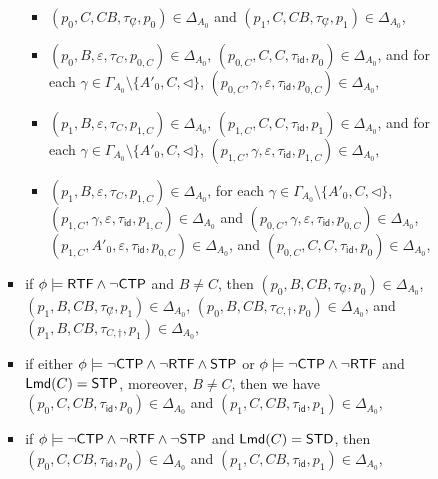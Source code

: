 \documentclass[preprint,12pt]{elsarticle}
\newcommand\lmd{{\sf Lmd}}
\newcommand\standard{{\sf STD}}
\newcommand\singletop{{\sf STP}}
\newcommand\ctpflag{{\sf CTP}}
\newcommand\stpflag{{\sf STP}}
\newcommand\rtfflag{{\sf RTF}}
\newcommand{\id}{\mathsf{id}}
\begin{document}
\begin{itemize}
\begin{itemize}
\begin{itemize}
\begin{itemize}
				\begin{itemize}
					\item $(p_0, C, CB, \tau_{\not C}, p_0) \in \Delta_{A_0}$ and $(p_1, C, CB, \tau_{\not C}, p_1) \in \Delta_{A_0}$, 
%
					\item $(p_0, B, \varepsilon, \tau_{C}, p_{0,C}) \in \Delta_{A_0}$, $(p_{0,C}, C, C, \tau_{\id}, p_0)  \in \Delta_{A_0}$, and for each $\gamma \in \Gamma_{A_0} \setminus \{A'_0, C, \triangleleft\}$, $(p_{0,C}, \gamma, \varepsilon, \tau_{\id}, p_{0,C}) \in \Delta_{A_0}$, 
%					
					\item $(p_1, B, \varepsilon, \tau_{C}, p_{1, C}) \in \Delta_{A_0}$, $(p_{1, C}, C, C, \tau_{\id}, p_1)  \in \Delta_{A_0}$, and for each $\gamma \in \Gamma_{A_0} \setminus \{A'_0, C, \triangleleft\}$, $(p_{1,C}, \gamma, \varepsilon, \tau_{\id}, p_{1,C}) \in \Delta_{A_0}$, 
%
					\item $(p_1, B, \varepsilon, \tau_{C}, p_{1, C}) \in \Delta_{A_0}$, for each $\gamma \in \Gamma_{A_0} \setminus \{A'_0, C, \triangleleft\}$, $(p_{1,C}, \gamma, \varepsilon, \tau_{\id}, p_{1,C}) \in \Delta_{A_0}$ and $(p_{0,C}, \gamma, \varepsilon, \tau_{\id}, p_{0,C}) \in \Delta_{A_0}$, 
					$(p_{1,C}, A'_0, \varepsilon, \tau_{\id}, p_{0,C}) \in \Delta_{A_0}$, and $(p_{0, C}, C, C, \tau_{\id}, p_0)  \in \Delta_{A_0}$, 
				\end{itemize}
%
				\item if $\phi \models \rtfflag \wedge \neg\ctpflag$ and $B\neq C$,  
                then $(p_0, B, CB, \tau_{\not C}, p_0) \in \Delta_{A_0}$, $(p_1, B, CB, \tau_{\not C}, p_1) \in \Delta_{A_0}$,  $(p_0, B, CB, \tau_{C, \dag}, p_0) \in \Delta_{A_0}$, 
                and $(p_1, B, CB, \tau_{C, \dag}, p_1) \in \Delta_{A_0}$,
%
				\item if either $\phi \models \neg\ctpflag \wedge \neg \rtfflag \wedge \stpflag$ or $\phi \models \neg\ctpflag \wedge \neg \rtfflag$ and $\lmd(C) = \singletop$, moreover, $B \neq C$, then we have $(p_0, C, CB, \tau_{\id}, p_0) \in \Delta_{A_0}$ and $(p_1, C, CB, \tau_{\id}, p_1) \in \Delta_{A_0}$, 
				\item if $\phi \models \neg\ctpflag \wedge \neg \rtfflag \wedge \neg \stpflag$ and $\lmd(C) = \standard$, then $(p_0, C, CB, \tau_{\id}, p_0) \in \Delta_{A_0}$ and $(p_1, C, CB, \tau_{\id}, p_1) \in \Delta_{A_0}$,
				\end{itemize}
				

\end{itemize}
\end{itemize}
\end{itemize}
\end{document}
